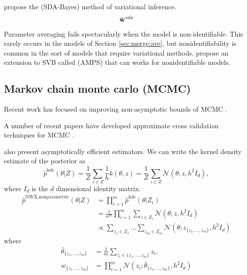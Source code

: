 \documentclass[thesis.tex]{subfiles}
\newcommand{\eye}[1]{I_{#1}}
\newcommand{\psup}[2]{\hat p^{#1}({#2})}
\newcommand{\pkde}[1]{\psup{\text{kde}}{#1}}
\newcommand{\pnp}[1]{\psup{\text{NWX,nonparametric}}{#1}}
\newcommand{\gaussian}[3]{\mathcal N({#1};{#2},{#3})}
\newcommand{\wvi}{\hat\w^\textit{vi}}
\newcommand{\wsda}{\hat\w^\textit{sda}}
\begin{document}
\citet{broderick2013streaming} propose the  (SDA-Bayes) method of variational inference.
\begin{equation}
    \wsda
\end{equation}

Parameter averaging fails spectacularly when the model is non-identifiable.
This rarely occurs in the models of Section \ref{sec:merge:ave}, 
but nonidentifiability is common in the sort of models that require variational methods.
\citet{campbell2014approximate} propose an extension to SVB called  (AMPS) that can works for nonidentifiable models.

\citet{neiswanger2015embarrassingly}


\subsection{Markov chain monte carlo (MCMC)}

Recent work has focused on improving non-asymptotic bounds of MCMC 
\citep[e.g.][]{latuszynski2013nonasymptotic,andrieu2015convergence,adamczak2015exponential,andrieu2016establishing}.

A number of recent papers have developed approximate cross validation techniques for MCMC
\citep{marshall2003approximate,
bhattacharya2007importance,
bornn2010efficient,
held2010posterior,
vehtari2012survey,
li2016approximating}.

\cite{neiswanger2014asymptotically} also present asymptotically efficient estimators.
We can write the kernel density estimate of the posterior as
\begin{equation}
    \pkde{\theta|Z}
    =
    \frac{1}{Z}\sum_{z\in Z}
    \frac{1}{h}k(\theta,z)
    =
    \frac{1}{Z}\sum_{z\in Z}
    \gaussian{\theta}{z}{h^2 \eye d}
    ,
\end{equation}
where $\eye d$ is the $d$ dimensional identity matrix.
\begin{align}
    \pnp{\theta|Z}
    &=
    \prod_{i=1}^m \pkde{\theta|Z_i}
    \\
    &=
    \frac{1}{n^m}
    \prod_{i=1}^m 
    \sum_{z\in Z_i}
    \gaussian{\theta}{z}{h^2 \eye d}
    \\
    &\propto
    \sum_{z_1\in Z_1}
    \dots
    \sum_{z_m\in Z_m}
    \gaussian{\theta}{z_{\{z_1,...,z_m\}}}{h^2 \eye d}
\end{align}
where
\begin{align}
    \bar\theta_{\{z_1,...,z_m\}} 
    &= 
    \frac{1}{m}\sum_{z_i\in\{z_1,...,z_m\}} z_i
    ,
    \\
    w_{\{z_1,...,z_m\}} 
    &=
    \prod_{i=1}^m\gaussian{z_i}{\bar\theta_{\{z_1,...,z_m\}}}{h^2\eye d}
\end{align}
\end{document}
